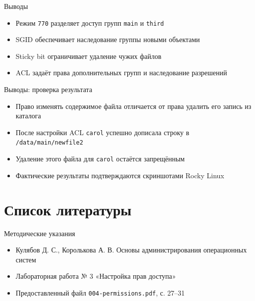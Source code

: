 \documentclass[
  ignorenonframetext,
  aspectratio=169,
  russian,
]{beamer}
\providecommand{\tightlist}{%
  \setlength{\itemsep}{0pt}\setlength{\parskip}{0pt}}
\begin{document}
\begin{frame}[fragile]{Выводы}
\begin{itemize}
\tightlist
\item
  Режим \texttt{770} разделяет доступ групп \texttt{main} и
  \texttt{third}
\item
  SGID обеспечивает наследование группы новыми объектами
\item
  Sticky bit ограничивает удаление чужих файлов
\item
  ACL задаёт права дополнительных групп и наследование разрешений
\end{itemize}
\end{frame}

\begin{frame}[fragile]{Выводы: проверка результата}
\protect{}\label{ux432ux44bux432ux43eux434ux44b-ux43fux440ux43eux432ux435ux440ux43aux430-ux440ux435ux437ux443ux43bux44cux442ux430ux442ux430}
\begin{itemize}
\tightlist
\item
  Право изменять содержимое файла отличается от права удалить его запись
  из каталога
\item
  После настройки ACL \texttt{carol} успешно дописала строку в
  \texttt{/data/main/newfile2}
\item
  Удаление этого файла для \texttt{carol} остаётся запрещённым
\item
  Фактические результаты подтверждаются скриншотами Rocky Linux
\end{itemize}
\end{frame}

\section*{Список
литературы}\label{ux441ux43fux438ux441ux43eux43a-ux43bux438ux442ux435ux440ux430ux442ux443ux440ux44b}

\begin{frame}[fragile]{Методические указания}
\protect{}\label{ux43cux435ux442ux43eux434ux438ux447ux435ux441ux43aux438ux435-ux443ux43aux430ux437ux430ux43dux438ux44f}
\begin{itemize}
\tightlist
\item
  Кулябов Д. С., Королькова А. В. Основы администрирования операционных
  систем
\item
  Лабораторная работа № 3 «Настройка прав доступа»
\item
  Предоставленный файл \texttt{004-permissions.pdf}, с. 27--31
\end{itemize}
\end{frame}
\end{document}
